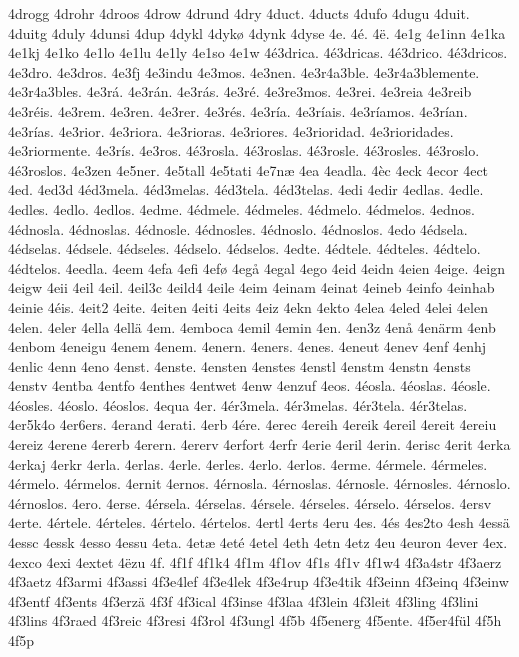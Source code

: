 4drogg
4drohr
4droos
4drow
4drund
4dry
4duct.
4ducts
4dufo
4dugu
4duit.
4duitg
4duly
4dunsi
4dup
4dykl
4dykø
4dynk
4dyse
4e.
4é.
4ë.
4e1g
4e1inn
4e1ka
4e1kj
4e1ko
4e1lo
4e1lu
4e1ly
4e1so
4e1w
4é3drica.
4é3dricas.
4é3drico.
4é3dricos.
4e3dro.
4e3dros.
4e3fj
4e3indu
4e3mos.
4e3nen.
4e3r4a3ble.
4e3r4a3blemente.
4e3r4a3bles.
4e3rá.
4e3rán.
4e3rás.
4e3ré.
4e3re3mos.
4e3rei.
4e3reia
4e3reib
4e3réis.
4e3rem.
4e3ren.
4e3rer.
4e3rés.
4e3ría.
4e3ríais.
4e3ríamos.
4e3rían.
4e3rías.
4e3rior.
4e3riora.
4e3rioras.
4e3riores.
4e3rioridad.
4e3rioridades.
4e3riormente.
4e3rís.
4e3ros.
4é3rosla.
4é3roslas.
4é3rosle.
4é3rosles.
4é3roslo.
4é3roslos.
4e3zen
4e5ner.
4e5tall
4e5tati
4e7næ
4ea
4eadla.
4èc
4eck
4ecor
4ect
4ed.
4ed3d
4éd3mela.
4éd3melas.
4éd3tela.
4éd3telas.
4edi
4edir
4edlas.
4edle.
4edles.
4edlo.
4edlos.
4edme.
4édmele.
4édmeles.
4édmelo.
4édmelos.
4ednos.
4édnosla.
4édnoslas.
4édnosle.
4édnosles.
4édnoslo.
4édnoslos.
4edo
4édsela.
4édselas.
4édsele.
4édseles.
4édselo.
4édselos.
4edte.
4édtele.
4édteles.
4édtelo.
4édtelos.
4eedla.
4eem
4efa
4efi
4efø
4egå
4egal
4ego
4eid
4eidn
4eien
4eige.
4eign
4eigw
4eii
4eil
4eil.
4eil3c
4eild4
4eile
4eim
4einam
4einat
4eineb
4einfo
4einhab
4einie
4éis.
4eit2
4eite.
4eiten
4eiti
4eits
4eiz
4ekn
4ekto
4elea
4eled
4elei
4elen
4elen.
4eler
4ella
4ellä
4em.
4emboca
4emil
4emin
4en.
4en3z
4enå
4enärm
4enb
4enbom
4eneigu
4enem
4enem.
4enern.
4eners.
4enes.
4eneut
4enev
4enf
4enhj
4enlic
4enn
4eno
4enst.
4enste.
4ensten
4enstes
4enstl
4enstm
4enstn
4ensts
4enstv
4entba
4entfo
4enthes
4entwet
4enw
4enzuf
4eos.
4éosla.
4éoslas.
4éosle.
4éosles.
4éoslo.
4éoslos.
4equa
4er.
4ér3mela.
4ér3melas.
4ér3tela.
4ér3telas.
4er5k4o
4er6ers.
4erand
4erati.
4erb
4ére.
4erec
4ereih
4ereik
4ereil
4ereit
4ereiu
4ereiz
4erene
4ererb
4erern.
4ererv
4erfort
4erfr
4erie
4eril
4erin.
4erisc
4erit
4erka
4erkaj
4erkr
4erla.
4erlas.
4erle.
4erles.
4erlo.
4erlos.
4erme.
4érmele.
4érmeles.
4érmelo.
4érmelos.
4ernit
4ernos.
4érnosla.
4érnoslas.
4érnosle.
4érnosles.
4érnoslo.
4érnoslos.
4ero.
4erse.
4érsela.
4érselas.
4érsele.
4érseles.
4érselo.
4érselos.
4ersv
4erte.
4értele.
4érteles.
4értelo.
4értelos.
4ertl
4erts
4eru
4es.
4és
4es2to
4esh
4essä
4essc
4essk
4esso
4essu
4eta.
4etæ
4eté
4etel
4eth
4etn
4etz
4eu
4euron
4ever
4ex.
4exco
4exi
4extet
4ëzu
4f.
4f1f
4f1k4
4f1m
4f1ov
4f1s
4f1v
4f1w4
4f3a4str
4f3aerz
4f3aetz
4f3armi
4f3assi
4f3e4lef
4f3e4lek
4f3e4rup
4f3e4tik
4f3einn
4f3einq
4f3einw
4f3entf
4f3ents
4f3erzä
4f3f
4f3ical
4f3inse
4f3laa
4f3lein
4f3leit
4f3ling
4f3lini
4f3lins
4f3raed
4f3reic
4f3resi
4f3rol
4f3ungl
4f5b
4f5energ
4f5ente.
4f5er4fül
4f5h
4f5p

